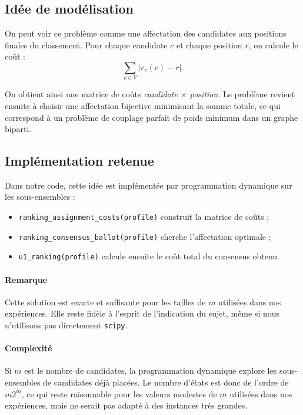 \documentclass[11pt,a4paper]{article}
\begin{document}
\subsection*{Id\'ee de mod\'elisation}

On peut voir ce probl\`eme comme une affectation des candidates aux positions finales du classement. Pour chaque candidate \(c\) et chaque position \(r\), on calcule le co\^ut :
\[
\sum_{v \in V} |r_v(c)-r|.
\]

On obtient ainsi une matrice de co\^uts \emph{candidate $\times$ position}. Le probl\`eme revient ensuite \`a choisir une affectation bijective minimisant la somme totale, ce qui correspond \`a un probl\`eme de couplage parfait de poids minimum dans un graphe biparti.

\subsection*{Impl\'ementation retenue}

Dans notre code, cette id\'ee est impl\'ement\'ee par programmation dynamique sur les sous-ensembles :
\begin{itemize}[leftmargin=*]
    \item \texttt{ranking\_assignment\_costs(profile)} construit la matrice de co\^uts ;
    \item \texttt{ranking\_consensus\_ballot(profile)} cherche l'affectation optimale ;
    \item \texttt{u1\_ranking(profile)} calcule ensuite le co\^ut total du consensus obtenu.
\end{itemize}

\paragraph{Remarque}
Cette solution est exacte et suffisante pour les tailles de \(m\) utilis\'ees dans nos exp\'eriences. Elle reste fid\`ele \`a l'esprit de l'indication du sujet, m\^eme si nous n'utilisons pas directement \texttt{scipy}.

\paragraph{Complexit\'e}
Si \(m\) est le nombre de candidates, la programmation dynamique explore les sous-ensembles de candidates d\'ej\`a plac\'ees. Le nombre d'\'etats est donc de l'ordre de \(m2^m\), ce qui reste raisonnable pour les valeurs modestes de \(m\) utilis\'ees dans nos exp\'eriences, mais ne serait pas adapt\'e \`a des instances tr\`es grandes.
\end{document}
